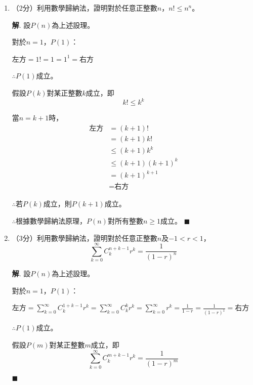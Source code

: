 \documentclass[12pt]{article}
\newenvironment*{sol}{\par \textbf{解}.}{\hfill$\blacksquare$}
\begin{document}
    \begin{enumerate}
        \item （2分）利用數學歸納法，證明對於任意正整數$n$，$n!\leq n^n$。\begin{sol}
            設$P(n)$為上述設理。

                對於$n=1$，$P(1)$：

                左方$=1!=1=1^1=$右方

                $\therefore P(1)$成立。

                假設$P(k)$對某正整數$k$成立，即$$k!\leq k^k$$

                當$n=k+1$時，\begin{align*}
                    \textrm{左方}&=(k+1)!\\
                    &=(k+1)k!\\
                    &\leq (k+1)k^k\\
                    &\leq (k+1)(k+1)^k\\
                    &=(k+1)^{k+1}\\
                    &=\textrm{右方}
                \end{align*}

                $\therefore$若$P(k)$成立，則$P(k+1)$成立。

                $\therefore$根據數學歸納法原理，$P(n)$對所有整數$n\geq 1$成立。
        \end{sol}
        \item （3分）利用數學歸納法，證明對於任意正整數$n$及$-1<r<1$，$$\sum_{k=0}^\infty C_k^{n+k-1}r^k=\frac{1}{(1-r)^n}$$\begin{sol}
            設$P(n)$為上述設理。

                對於$n=1$，$P(1)$：

                左方$=\sum_{k=0}^\infty C_k^{1+k-1}r^k=\sum_{k=0}^{\infty}C_k^kr^k=\sum_{k=0}^{\infty}r^k=\frac{1}{1-r}=\frac{1}{(1-r)^1}=$右方

                $\therefore P(1)$成立。

                假設$P(m)$對某正整數$m$成立，即$$\sum_{k=0}^\infty C_k^{m+k-1}r^k=\frac{1}{(1-r)^m}$$


\end{sol}
\end{enumerate}
\end{document}
